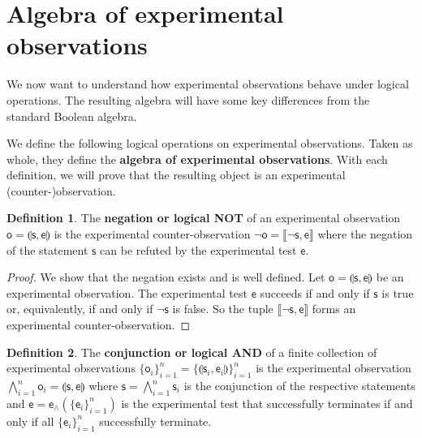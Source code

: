 \documentclass[review]{elsarticle}
\theoremstyle{plain}%
\theoremstyle{definition}
\newtheorem{defn}{Definition}[section]
\theoremstyle{remark}
\begin{document}
\section{Algebra of experimental observations}

We now want to understand how experimental observations behave under logical operations. The resulting algebra will have some key differences from the standard Boolean algebra.





We define the following logical operations on experimental observations. Taken as whole, they define the \textbf{algebra of experimental observations}. With each definition, we will prove that the resulting object is an experimental (counter-)observation. 

\begin{defn}
	The \textbf{negation or logical NOT} of an experimental observation $\mathsf{o}=\llparenthesis \mathsf{s}, \mathsf{e}\rrparenthesis$ is the experimental counter-observation $\neg \mathsf{o}=\llbracket\neg \mathsf{s}, \mathsf{e}\rrbracket$ where the negation of the statement $\mathsf{s}$ can be refuted by the experimental test $\mathsf{e}$.
\end{defn}

\begin{proof}
	We show that the negation exists and is well defined. Let $\mathsf{o}=\llparenthesis \mathsf{s}, \mathsf{e}\rrparenthesis$ be an experimental observation. The experimental test $\mathsf{e}$ succeeds if and only if $\mathsf{s}$ is true or, equivalently, if and only if $\neg \mathsf{s}$ is false. So the tuple $\llbracket\neg \mathsf{s}, \mathsf{e}\rrbracket$ forms an experimental counter-observation.
\end{proof}

\begin{defn}
	The \textbf{conjunction or logical AND} of a finite collection  of experimental observations $\{\mathsf{o}_i\}_{i=1}^{n}=\{\llparenthesis \mathsf{s}_i, \mathsf{e}_i\rrparenthesis\}_{i=1}^{n}$ is the experimental observation $\bigwedge\limits_{i=1}^{n} \mathsf{o}_i = \llparenthesis \mathsf{s}, \mathsf{e}\rrparenthesis$ where $\mathsf{s} = \bigwedge\limits_{i=1}^{n} \mathsf{s}_i$ is the conjunction of the respective statements and $\mathsf{e} = \mathsf{e}_\wedge(\{\mathsf{e}_i\}_{i=1}^{n})$ is the experimental test that successfully terminates if and only if all $\{\mathsf{e}_i\}_{i=1}^{n}$ successfully terminate.
\end{defn}
\end{document}
